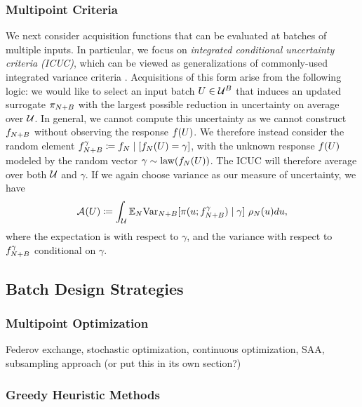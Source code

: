 \documentclass[12pt]{article}
\begin{document}
\subsubsection{Multipoint Criteria}
We next consider acquisition functions that can be evaluated at batches of multiple inputs. In particular,
we focus on \textit{integrated conditional uncertainty criteria (ICUC)}, which can be viewed as generalizations 
of commonly-used integrated variance criteria \citep{ALC,Mercer_kernels_IVAR,Binois_2018,deepGPAL}. 
Acquisitions of this form arise from the following logic: we would like to select an input batch 
$\parMat \in \parSpace^{\Nbatch}$ that induces an updated surrogate $\postEm[\Naugment]$ with the largest 
possible reduction in uncertainty on average over $\parSpace$. In general, we cannot compute this uncertainty
as we cannot construct $\funcEm[\Naugment]$ without observing the response $\func(\parMat)$. We therefore
instead consider the random element 
$\funcEm[\Naugment]^{\gamma} \Def \funcEm[\Ndesign] \given [\funcEm[\Ndesign](\parMat) = \gamma]$, with 
the unknown response $\func(\parMat)$ modeled by the random vector 
$\gamma \sim \mathrm{law}(\funcEm[\Ndesign](\parMat))$. The ICUC will therefore average over both $\parSpace$
and $\gamma$. If we again choose variance as our measure of uncertainty, we have
\begin{equation}
\acq[](\parMat) \Def 
\int_{\parSpace} \E_{\Ndesign} \Var_{\Naugment}[\postDens(\Par; \funcEm[\Naugment]^{\gamma}) \given \gamma] \ \weightDens(\Par) d\Par,
 \label{eq:acq-intvar}
\end{equation}
where the expectation is with respect to $\gamma$, and the variance with respect to $\funcEm[\Naugment]^{\gamma}$
conditional on $\gamma$.

\subsection{Batch Design Strategies}
\subsubsection{Multipoint Optimization}
Federov exchange, stochastic optimization, continuous optimization, SAA,
subsampling approach (or put this in its own section?)

\subsubsection{Greedy Heuristic Methods} \label{sec:batch-heuristic}
\end{document}
